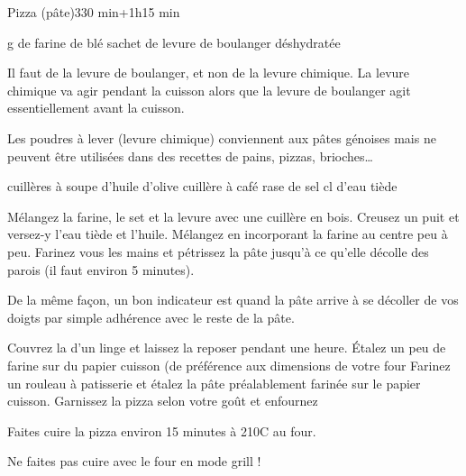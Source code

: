 \begin{recette}{Pizza (pâte)}{3}{30 min+1h}{15 min}
\begin{ingredients}
 g de farine de blé
 sachet de levure de boulanger déshydratée
\begin{remarque}
Il faut de la levure de boulanger, et non de la levure chimique. La levure chimique va agir pendant la cuisson alors que la levure de boulanger agit essentiellement avant la cuisson. 

Les poudres à lever (levure chimique) conviennent aux pâtes génoises mais ne peuvent être utilisées dans des recettes de pains, pizzas, brioches\dots
\end{remarque}

 cuillères à soupe d’huile d’olive
 cuillère à café rase de sel
 cl d’eau tiède

\end{ingredients}

\begin{preparation}
\etape Mélangez la farine, le set et la levure avec une cuillère en bois. 
\etape Creusez un puit et versez-y l'eau tiède et l'huile. 
\etape Mélangez en incorporant la farine au centre peu à peu.
\etape Farinez vous les mains et pétrissez la pâte jusqu'à ce qu'elle décolle des parois (il faut environ 5 minutes).
\begin{remarque}
De la même façon, un bon indicateur est quand la pâte arrive à se décoller de vos doigts par simple adhérence avec le reste de la pâte. 
\end{remarque}
\etape Couvrez la d'un linge et laissez la reposer pendant une heure.
\etape Étalez un peu de farine sur du papier cuisson (de préférence aux dimensions de votre four
\etape Farinez un rouleau à patisserie et étalez la pâte préalablement farinée sur le papier cuisson. 
\etape Garnissez la pizza selon votre goût et enfournez
\end{preparation}

\begin{cuisson}
Faites cuire la pizza environ 15 minutes à 210\degres C au four.

\begin{attention}
Ne faites pas cuire avec le four en mode grill !
\end{attention}

\end{cuisson}


\end{recette}

